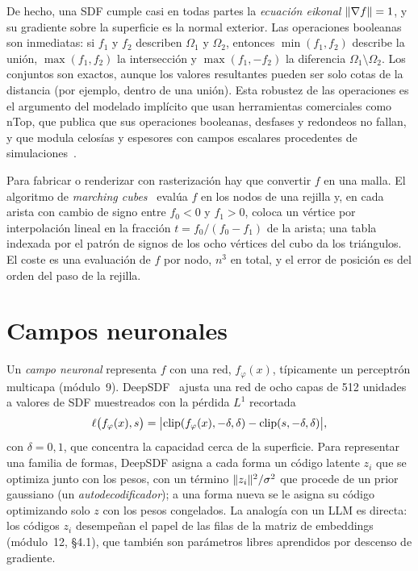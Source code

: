 De hecho, una SDF cumple casi en todas partes la \emph{ecuación eikonal} $\lVert\nabla f\rVert=1$, y su gradiente sobre la superficie es la normal exterior. Las operaciones booleanas son inmediatas: si $f_1$ y $f_2$ describen $\Omega_1$ y $\Omega_2$, entonces $\min(f_1,f_2)$ describe la unión, $\max(f_1,f_2)$ la intersección y $\max(f_1,-f_2)$ la diferencia $\Omega_1\setminus\Omega_2$. Los conjuntos son exactos, aunque los valores resultantes pueden ser solo cotas de la distancia (por ejemplo, dentro de una unión). Esta robustez de las operaciones es el argumento del modelado implícito que usan herramientas comerciales como nTop, que publica que sus operaciones booleanas, desfases y redondeos no fallan, y que modula celosías y espesores con campos escalares procedentes de simulaciones~\cite{ntop}.

Para fabricar o renderizar con rasterización hay que convertir $f$ en una malla. El algoritmo de \emph{marching cubes}~\cite{mc} evalúa $f$ en los nodos de una rejilla y, en cada arista con cambio de signo entre $f_0<0$ y $f_1>0$, coloca un vértice por interpolación lineal en la fracción $t=f_0/(f_0-f_1)$ de la arista; una tabla indexada por el patrón de signos de los ocho vértices del cubo da los triángulos. El coste es una evaluación de $f$ por nodo, $n^3$ en total, y el error de posición es del orden del paso de la rejilla.

\section{Campos neuronales}

Un \emph{campo neuronal} representa $f$ con una red, $f_\varphi(x)$, típicamente un perceptrón multicapa (módulo~9). DeepSDF~\cite{deepsdf} ajusta una red de ocho capas de 512 unidades a valores de SDF muestreados con la pérdida $L^1$ recortada
\[
\ell\bigl(f_\varphi(x),s\bigr)=\bigl\lvert\operatorname{clip}(f_\varphi(x),-\delta,\delta)-\operatorname{clip}(s,-\delta,\delta)\bigr\rvert,
\]
con $\delta=0{,}1$, que concentra la capacidad cerca de la superficie. Para representar una familia de formas, DeepSDF asigna a cada forma un código latente $z_i$ que se optimiza junto con los pesos, con un término $\lVert z_i\rVert^2/\sigma^2$ que procede de un prior gaussiano (un \emph{autodecodificador}); a una forma nueva se le asigna su código optimizando solo $z$ con los pesos congelados. La analogía con un LLM es directa: los códigos $z_i$ desempeñan el papel de las filas de la matriz de embeddings (módulo~12, §4.1), que también son parámetros libres aprendidos por descenso de gradiente.

